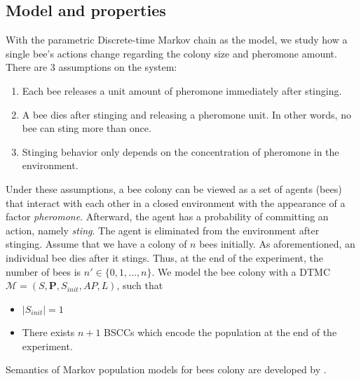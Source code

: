 \subsection{Model and properties}
With the parametric Discrete-time Markov chain as the model, we study how a single bee's actions
change regarding the colony size and pheromone amount. There are 3 assumptions on the system:
\begin{enumerate}
    \item Each bee releases a unit amount of pheromone immediately after stinging.
    \item A bee dies after stinging and releasing a pheromone unit. In other words, no bee can sting
          more than once.
    \item Stinging behavior only depends on the concentration of pheromone in the environment.
\end{enumerate}
Under these assumptions, a bee colony can be viewed as a set of agents (bees) that interact with
each other in a closed environment with the appearance of a factor \textit{pheromone}. Afterward,
the agent has a probability of committing an action, namely \textit{sting}. The agent is eliminated
from the environment after stinging. Assume that we have a colony of $n$ bees initially. As
aforementioned, an individual bee dies after it stings. Thus, at the end of the experiment, the number
of bees is $n'\in\{0,1,\ldots,n\}$. We model the bee colony with a DTMC $\mathcal{M}=(S,\mathbf{P},
    S_{init}, AP,L)$, such that
\begin{itemize}
    \item $|S_{init}|=1$
    \item There exists $n+1$ BSCCs which encode the population at the end of the experiment.
\end{itemize}
Semantics of Markov population models for bees colony are developed by \cite{hajnal2019data}.
